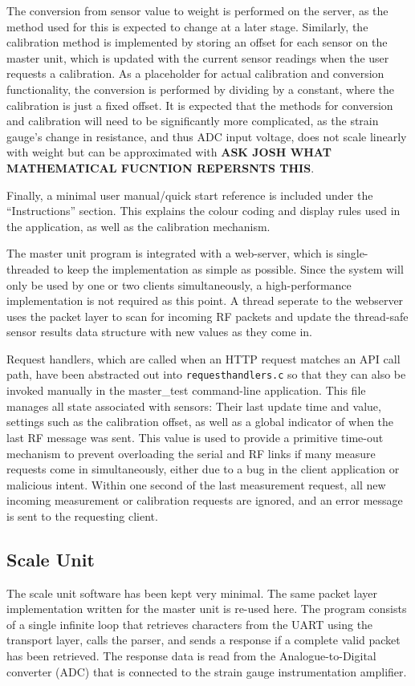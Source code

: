 The conversion from sensor value to weight is performed on the server, as the method used for this is expected to change at a later stage. Similarly, the calibration method is implemented by storing an offset for each sensor on the master unit, which is updated with the current sensor readings when the user requests a calibration. As a placeholder for actual calibration and conversion functionality, the conversion is performed by dividing by a constant, where the calibration is just a fixed offset. It is expected that the methods for conversion and calibration will need to be significantly more complicated, as the strain gauge's change in resistance, and thus ADC input voltage, does not scale linearly with weight but can be approximated with \textbf{ASK JOSH WHAT MATHEMATICAL FUCNTION REPERSNTS THIS}.

Finally, a minimal user manual/quick start reference is included under the ``Instructions'' section. This explains the colour coding and display rules used in the application, as well as the calibration mechanism.

The master unit program is integrated with a web-server, which is single-threaded to keep the implementation as simple as possible. Since the system will only be used by one or two clients simultaneously, a high-performance implementation is not required as this point. A thread seperate to the webserver uses the packet layer to scan for incoming RF packets and update the thread-safe sensor results data structure with new values as they come in.

Request handlers, which are called when an HTTP request matches an API call path, have been abstracted out into \texttt{requesthandlers.c} so that they can also be invoked manually in the master\_test command-line application. This file manages all state associated with sensors: Their last update time and value, settings such as the calibration offset, as well as a global indicator of when the last RF message was sent. This value is used to provide a primitive time-out mechanism to prevent overloading the serial and RF links if many measure requests come in simultaneously, either due to a bug in the client application or malicious intent. Within one second of the last measurement request, all new incoming measurement or calibration requests are ignored, and an error message is sent to the requesting client.

\subsection{Scale Unit}
The scale unit software has been kept very minimal. The same packet layer implementation written for the master unit is re-used here. The program consists of a single infinite loop that retrieves characters from the UART using the transport layer, calls the parser, and sends a response if a complete valid packet has been retrieved. The response data is read from the Analogue-to-Digital converter (ADC) that is connected to the strain gauge instrumentation amplifier.
